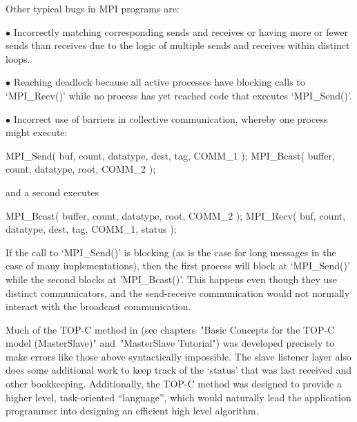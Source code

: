 Other typical bugs in MPI programs are:

\beginlist

\item{$\bullet$}
    Incorrectly matching corresponding sends and receives or having  more
    or fewer sends than receives due to the logic of multiple  sends  and
    receives within distinct loops.

\item{$\bullet$}
    Reaching deadlock because all active processes have blocking calls to
    `MPI_Recv()' while no process has  yet  reached  code  that  executes
    `MPI_Send()'.

\item{$\bullet$}
    Incorrect use of barriers in collective  communication,  whereby  one
    process might execute:

\begintt
MPI_Send( buf, count, datatype, dest, tag, COMM_1 );
MPI_Bcast( buffer, count, datatype, root, COMM_2 );
\endtt

\item{}
    and a second executes

\begintt
MPI_Bcast( buffer, count, datatype, root, COMM_2 );
MPI_Recv( buf, count, datatype, dest, tag, COMM_1, status );
\endtt

\item{}
    If the call to `MPI_Send()' is blocking (as  is  the  case  for  long
    messages in the case of many implementations), then the first process
    will block at `MPI_Send()' while the second blocks at  'MPI_Bcast()'.
    This happens even though they use  distinct  communicators,  and  the
    send-receive communication  would  not  normally  interact  with  the
    broadcast communication.

\endlist

Much of the TOP-C method in {\ParGAP} (see chapters~"Basic  Concepts  for
the TOP-C model (MasterSlave)" and~"MasterSlave Tutorial") was  developed
precisely to make errors like those above syntactically  impossible.  The
slave listener layer also does some additional work to keep track of  the
`status' that was last received and other bookkeeping. Additionally,  the
TOP-C method was  designed  to  provide  a  higher  level,  task-oriented
``language'', which would naturally lead the application programmer  into
designing an efficient high level algorithm.


